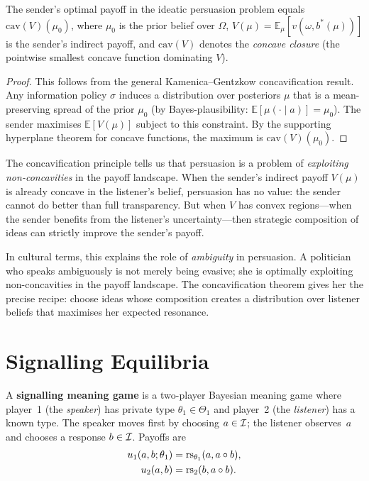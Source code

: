 \begin{theorem}
\label{thm:concavification}
The sender's optimal payoff in the ideatic persuasion problem equals
$\mathrm{cav}(V)(\mu_0)$, where $\mu_0$ is the prior belief over
$\Omega$, $V(\mu) = \mathbb{E}_\mu[v(\omega, b^*(\mu))]$ is the
sender's indirect payoff, and $\mathrm{cav}(V)$ denotes the
\emph{concave closure} (the pointwise smallest concave function
dominating $V$).
\end{theorem}

\begin{proof}
This follows from the general Kamenica--Gentzkow concavification result.
Any information policy $\sigma$ induces a distribution over posteriors
$\mu$ that is a mean-preserving spread of the prior $\mu_0$ (by
Bayes-plausibility: $\mathbb{E}[\mu(\cdot \mid a)] = \mu_0$).
The sender maximises $\mathbb{E}[V(\mu)]$ subject to this constraint.
By the supporting hyperplane theorem for concave functions, the
maximum is $\mathrm{cav}(V)(\mu_0)$.
\end{proof}

\begin{interpretation}
The concavification principle tells us that persuasion is a problem
of \emph{exploiting non-concavities} in the payoff landscape.  When
the sender's indirect payoff $V(\mu)$ is already concave in the
listener's belief, persuasion has no value: the sender cannot do better
than full transparency.  But when $V$ has convex regions---when the
sender benefits from the listener's uncertainty---then strategic
composition of ideas can strictly improve the sender's payoff.

In cultural terms, this explains the role of \emph{ambiguity} in
persuasion.  A politician who speaks ambiguously is not merely being
evasive; she is optimally exploiting non-concavities in the payoff
landscape.  The concavification theorem gives her the precise recipe:
choose ideas whose composition creates a distribution over listener
beliefs that maximises her expected resonance.
\end{interpretation}

\section{Signalling Equilibria}
\label{sec:signalling}

\begin{definition}
\label{def:signalling-game}
A \textbf{signalling meaning game} is a two-player Bayesian
meaning game where player~1 (the \emph{speaker}) has private
type $\theta_1 \in \Theta_1$ and player~2 (the \emph{listener})
has a known type.  The speaker moves first by choosing
$a \in \mathcal{I}$; the listener observes~$a$ and chooses a response
$b \in \mathcal{I}$.  Payoffs are
\begin{align*}
  u_1(a,b;\theta_1)
  &= \mathrm{rs}_{\theta_1}(a, a \circ b), \\
  u_2(a,b)
  &= \mathrm{rs}_2(b, a \circ b).
\end{align*}
\end{definition}

